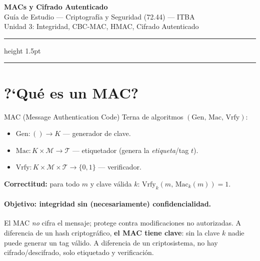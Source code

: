 \documentclass[11pt,a4paper]{article}
\begin{document}
\begin{center}
  {\LARGE\bfseries\color{mainblue} MACs y Cifrado Autenticado}\\[4pt]
  {\large Gu\'ia de Estudio --- Criptograf\'ia y Seguridad (72.44) --- ITBA}\\[2pt]
  {\small\color{darkgray} Unidad 3: Integridad, CBC-MAC, HMAC, Cifrado Autenticado}
\end{center}
\vspace{2pt}
\hrule height 1.5pt
\vspace{8pt}

\tableofcontents
\vspace{6pt}
\hrule
\vspace{10pt}

\section{?`Qu\'e es un MAC?}

\begin{definicion}{MAC (Message Authentication Code)}
Terna de algoritmos $(\mathrm{Gen},\,\mathrm{Mac},\,\mathrm{Vrfy})$:
\begin{itemize}[leftmargin=1.4em,nosep]
  \item $\mathrm{Gen}: () \to K$ \quad --- generador de clave.
  \item $\mathrm{Mac}: K \times \mathcal{M} \to \mathcal{T}$ \quad --- etiquetador
        (genera la \emph{etiqueta}/tag $t$).
  \item $\mathrm{Vrfy}: K \times \mathcal{M} \times \mathcal{T} \to \{0,1\}$ \quad ---
        verificador.
\end{itemize}
\textbf{Correctitud:} para todo $m$ y clave v\'alida $k$:
$\mathrm{Vrfy}_k(m,\,\mathrm{Mac}_k(m))=1$.
\end{definicion}

\paragraph{Objetivo: integridad sin (necesariamente) confidencialidad.}
El MAC \emph{no} cifra el mensaje; protege contra modificaciones no autorizadas.
A diferencia de un hash criptogr\'afico, \textbf{el MAC tiene clave}: sin la clave
$k$ nadie puede generar un tag v\'alido.  A diferencia de un criptosistema, no hay
cifrado/descifrado, solo etiquetado y verificaci\'on.
\end{document}
